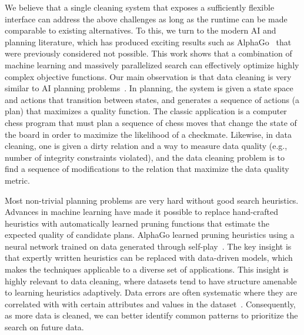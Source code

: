 We believe that a single cleaning system that exposes a sufficiently flexible interface can address the above challenges as long as the runtime can be made comparable to existing alternatives.  
To this, we turn to the modern AI and planning literature, which has produced exciting results such as AlphaGo~\cite{silver2016mastering} that were previously considered not possible.    This work shows that a combination of machine learning and massively parallelized search can effectively optimize highly complex objective functions.
Our main observation is that data cleaning is very similar to AI planning problems~\cite{russell1995modern}.
In planning, the system is given a state space and actions that transition between states, and generates a sequence of actions (a plan) that maximizes a quality function. The classic application is a computer chess program that must plan a sequence of chess moves that change the state of the board in order to maximize the likelihood of a checkmate. Likewise, in data cleaning, one is given a dirty relation and a way to measure data quality (e.g., number of integrity constraints violated), and the data cleaning problem is to find a sequence of modifications to the relation that maximize the data quality metric.

Most non-trivial planning problems are very hard without good search heuristics.
Advances in machine learning have made it possible to replace hand-crafted heuristics with automatically learned pruning functions that estimate the expected quality of candidate plans. AlphaGo learned pruning heuristics using a neural network trained on data generated through self-play~\cite{silver2016mastering}. 
The key insight is that expertly written heuristics can be replaced with data-driven models, which makes the techniques applicable to a diverse set of applications.   
This insight is highly relevant to data cleaning, where datasets tend to have structure amenable to learning heuristics adaptively.
Data errors are often systematic where they are correlated with with certain attributes and values in the dataset~\cite{rekatsinas2017holoclean,DBLP:journals/pvldb/KrishnanWWFG16}.
Consequently, as more data is cleaned, we can better identify common patterns to prioritize the search on future data.

